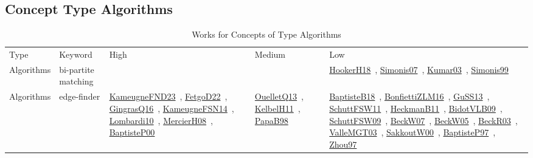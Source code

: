 \clearpage
\subsection{Concept Type Algorithms}
\label{sec:Algorithms}
{\scriptsize
\begin{longtable}{lp{3cm}>{\raggedright\arraybackslash}p{6cm}>{\raggedright\arraybackslash}p{6cm}>{\raggedright\arraybackslash}p{8cm}}
\rowcolor{white}\caption{Works for Concepts of Type Algorithms}\\ \toprule
\rowcolor{white}Type & Keyword & High & Medium & Low\\ \midrule\endhead
\bottomrule
\endfoot
Algorithms & bi-partite matching &  &  & \href{works/HookerH18.pdf}{HookerH18}~\cite{HookerH18}, \href{works/Simonis07.pdf}{Simonis07}~\cite{Simonis07}, \href{works/Kumar03.pdf}{Kumar03}~\cite{Kumar03}, \href{works/Simonis99.pdf}{Simonis99}~\cite{Simonis99}\\
Algorithms & edge-finder & \href{works/KameugneFND23.pdf}{KameugneFND23}~\cite{KameugneFND23}, \href{works/FetgoD22.pdf}{FetgoD22}~\cite{FetgoD22}, \href{works/GingrasQ16.pdf}{GingrasQ16}~\cite{GingrasQ16}, \href{works/KameugneFSN14.pdf}{KameugneFSN14}~\cite{KameugneFSN14}, \href{works/Lombardi10.pdf}{Lombardi10}~\cite{Lombardi10}, \href{works/MercierH08.pdf}{MercierH08}~\cite{MercierH08}, \href{works/BaptisteP00.pdf}{BaptisteP00}~\cite{BaptisteP00} & \href{works/OuelletQ13.pdf}{OuelletQ13}~\cite{OuelletQ13}, \href{works/KelbelH11.pdf}{KelbelH11}~\cite{KelbelH11}, \href{works/PapaB98.pdf}{PapaB98}~\cite{PapaB98} & \href{works/BaptisteB18.pdf}{BaptisteB18}~\cite{BaptisteB18}, \href{works/BonfiettiZLM16.pdf}{BonfiettiZLM16}~\cite{BonfiettiZLM16}, \href{works/GuSS13.pdf}{GuSS13}~\cite{GuSS13}, \href{works/SchuttFSW11.pdf}{SchuttFSW11}~\cite{SchuttFSW11}, \href{works/HeckmanB11.pdf}{HeckmanB11}~\cite{HeckmanB11}, \href{works/BidotVLB09.pdf}{BidotVLB09}~\cite{BidotVLB09}, \href{works/SchuttFSW09.pdf}{SchuttFSW09}~\cite{SchuttFSW09}, \href{works/BeckW07.pdf}{BeckW07}~\cite{BeckW07}, \href{works/BeckW05.pdf}{BeckW05}~\cite{BeckW05}, \href{works/BeckR03.pdf}{BeckR03}~\cite{BeckR03}, \href{works/ValleMGT03.pdf}{ValleMGT03}~\cite{ValleMGT03}, \href{works/SakkoutW00.pdf}{SakkoutW00}~\cite{SakkoutW00}, \href{works/BaptisteP97.pdf}{BaptisteP97}~\cite{BaptisteP97}, \href{works/Zhou97.pdf}{Zhou97}~\cite{Zhou97}\\

\end{longtable}}
